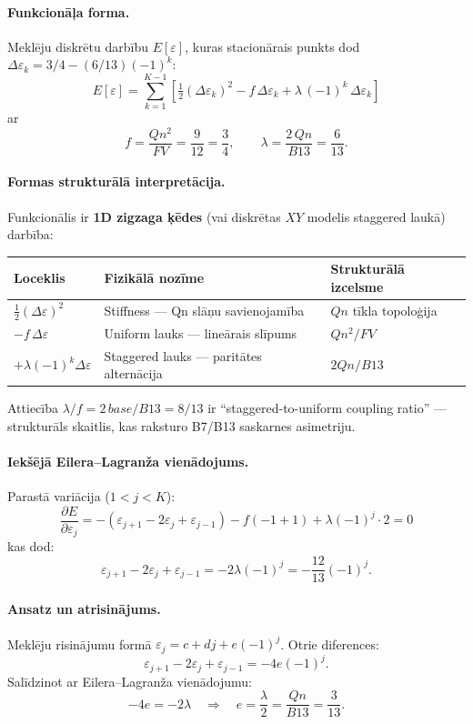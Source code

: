 \documentclass[12pt,a4paper]{article}
\begin{document}
\paragraph{Funkcionāļa forma.}
Meklēju diskrētu darbību $E[\varepsilon]$, kuras stacionārais punkts dod $\Delta\varepsilon_k = 3/4 - (6/13)(-1)^k$:
\[
\boxed{\; E[\varepsilon] = \sum_{k=1}^{K-1}\left[\tfrac{1}{2}(\Delta\varepsilon_k)^2 - f\,\Delta\varepsilon_k + \lambda\,(-1)^k\,\Delta\varepsilon_k\right] \;}
\]
ar
\[
f = \frac{Qn^2}{FV} = \frac{9}{12} = \frac{3}{4}, \qquad \lambda = \frac{2\,Qn}{B13} = \frac{6}{13}.
\]

\paragraph{Formas strukturālā interpretācija.}
Funkcionālis ir \textbf{1D zigzaga ķēdes} (vai diskrētas $XY$ modelis staggered laukā) darbība:

\begin{table}[h]
\centering
\begin{tabular}{|l|l|l|}
\hline
\textbf{Loceklis} & \textbf{Fizikālā nozīme} & \textbf{Strukturālā izcelsme} \\
\hline
$\tfrac{1}{2}(\Delta\varepsilon)^2$ & Stiffness — Qn slāņu savienojamība & $Qn$ tīkla topoloģija \\
$-f\,\Delta\varepsilon$ & Uniform lauks — lineārais slīpums & $Qn^2/FV$ \\
$+\lambda(-1)^k\Delta\varepsilon$ & Staggered lauks — paritātes alternācija & $2Qn/B13$ \\
\hline
\end{tabular}
\end{table}

Attiecība $\lambda/f = 2\,base/B13 = 8/13$ ir ``staggered-to-uniform coupling ratio'' — strukturāls skaitlis, kas raksturo B7/B13 saskarnes asimetriju.

\paragraph{Iekšējā Eilera--Lagranža vienādojums.}
Parastā variācija ($1 < j < K$):
\[
\frac{\partial E}{\partial \varepsilon_j} = -(\varepsilon_{j+1} - 2\varepsilon_j + \varepsilon_{j-1}) - f(-1+1) + \lambda(-1)^j \cdot 2 = 0
\]
kas dod:
\[
\varepsilon_{j+1} - 2\varepsilon_j + \varepsilon_{j-1} = -2\lambda(-1)^j = -\frac{12}{13}(-1)^j.
\]

\paragraph{Ansatz un atrisinājums.}
Meklēju risinājumu formā $\varepsilon_j = c + dj + e(-1)^j$. Otrie diferences:
\[
\varepsilon_{j+1} - 2\varepsilon_j + \varepsilon_{j-1} = -4e(-1)^j.
\]
Salīdzinot ar Eilera--Lagranža vienādojumu:
\[
-4e = -2\lambda \quad \Rightarrow \quad e = \frac{\lambda}{2} = \frac{Qn}{B13} = \frac{3}{13}.
\]
\end{document}

